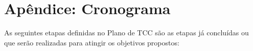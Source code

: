 \chapter{Apêndice: Cronograma}
\label{ap:crono}


As seguintes etapas definidas no Plano de \ac{TCC} são as etapas já concluídas ou que serão realizadas para atingir os objetivos propostos:

	




